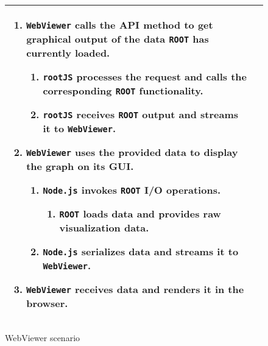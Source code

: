 \begin{figure}[htb]
\begin{longtable}{p{3cm} @{\hskip 1cm} p{12cm}}
\begin{enumerate}
			\item \texttt{WebViewer} calls the API method to get graphical output of the data \texttt{ROOT} has currently loaded.
				\begin{enumerate}
					\item \texttt{rootJS} processes the request and calls the corresponding \texttt{ROOT} functionality.
					\item \texttt{rootJS} receives \texttt{ROOT} output and streams it to \texttt{WebViewer}.
				\end{enumerate}
			\item \texttt{WebViewer} uses the provided data to display the graph on its GUI.
				\begin{enumerate}
					\item \texttt{Node.js} invokes \texttt{ROOT} I/O operations.
						\begin{enumerate}
							\item \texttt{ROOT} loads data and provides raw visualization data.
						\end{enumerate}
					\item \texttt{Node.js} serializes data and streams it to \texttt{WebViewer}.
				\end{enumerate}
			\item \texttt{WebViewer} receives data and renders it in the browser.
		\end{enumerate}
		\\
		\hline
		
	\end{longtable}
	
	\caption{WebViewer scenario}
	
\end{figure}
\vfill
{}

\pagebreak[4]

